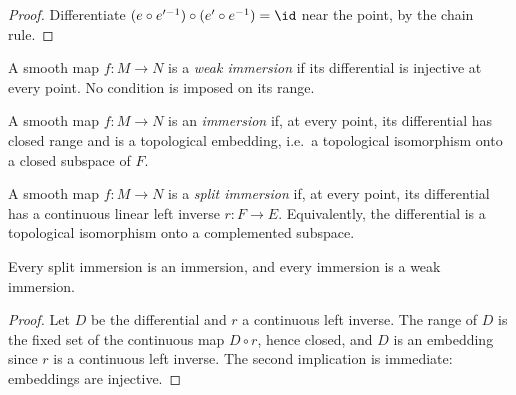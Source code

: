 \begin{proof}
  \leanok
  Differentiate $(e \circ e'^{-1}) \circ (e' \circ e^{-1}) = \id$ near the point, by the
  chain rule.
\end{proof}

\begin{definition}
  \label{def:weak-immersion}
  \leanok
  A smooth map $f \colon M \to N$ is a \emph{weak immersion} if its differential is injective
  at every point. No condition is imposed on its range.
\end{definition}

\begin{definition}[Immersion]
  \label{def:immersion}
  \leanok
  A smooth map $f \colon M \to N$ is an \emph{immersion} if, at every point, its differential
  has closed range and is a topological embedding, i.e.\ a topological isomorphism onto a
  closed subspace of $F$.
\end{definition}

\begin{definition}
  \label{def:split-immersion}
  \leanok
  A smooth map $f \colon M \to N$ is a \emph{split immersion} if, at every point, its
  differential has a continuous linear left inverse $r \colon F \to E$. Equivalently, the
  differential is a topological isomorphism onto a complemented subspace.
\end{definition}

\begin{proposition}
  \label{prop:sub-immersion-implications}
  \leanok
  Every split immersion is an immersion, and every immersion is a weak immersion.
\end{proposition}

\begin{proof}
  \leanok
  Let $D$ be the differential and $r$ a continuous left inverse. The range of $D$ is the fixed
  set of the continuous map $D \circ r$, hence closed, and $D$ is an embedding since $r$ is a
  continuous left inverse. The second implication is immediate: embeddings are injective.
\end{proof}

